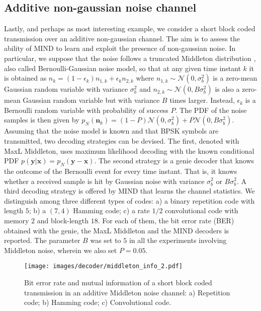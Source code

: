 \subsection{Additive non-gaussian noise channel}
Lastly, and perhaps as most interesting example, we consider a short block coded transmission over an additive non-gaussian channel. The aim is to assess the ability of MIND to learn and exploit the presence of non-gaussian noise. In particular, we suppose that the noise follows a truncated Middleton distribution \cite{Middleton1977}, also called Bernoulli-Gaussian noise model, so that at any given time instant $k$ it is obtained as $n_k = (1-\epsilon_k)n_{1,k}+\epsilon_k n_{2,k}$ where $n_{1,k} \sim \mathcal{N}(0,\sigma_b^2)$ is a zero-mean Gaussian random variable with variance $\sigma_b^2$ and $n_{2,k} \sim \mathcal{N}(0,B\sigma_b^2)$ is also a zero-mean Gaussian random variable but with variance $B$ times larger. Instead, $\epsilon_k$ is a Bernoulli random variable with probability of success $P$. The PDF of the noise samples is then given by
$p_{N}(\mathbf{n}_k) = (1-P)\mathcal{N}(0,\sigma_b^2)+P\mathcal{N}(0,B\sigma_b^2).$
Assuming that the noise model is known and that BPSK symbols are transmitted, two decoding strategies can be devised. The first, denoted with MaxL Middleton, uses maximum likelihood decoding with the known conditional PDF $p(\mathbf{y}|\mathbf{x})=p_{N}(\mathbf{y}-\mathbf{x})$. The second strategy is a genie decoder that knows the outcome of the Bernoulli event for every time instant. That is, it knows whether a received sample is hit by Gaussian noise with variance $\sigma_b^2$ or $B\sigma_b^2$. A third decoding strategy is offered by MIND that learns the channel statistics.
We distinguish among three different types of codes: a) a binary repetition code with length $5$; b) a $(7,4)$ Hamming code; c) a rate $1/2$ convolutional code with memory $2$ and block-length $18$. For each of them, the bit error rate (BER) obtained with the genie, the MaxL Middleton and the MIND decoders is reported. The parameter $B$ was set to $5$ in all the experiments involving Middleton noise, wherein we also set $P=0.05$. 

\begin{figure*}[b]
	\centering
	\texttt{[image: images/decoder/middleton\_info\_2.pdf]}
	\caption{Bit error rate and mutual information of a short block coded transmission in an additive Middleton noise channel: a) Repetition code; b) Hamming code; c) Convolutional code.}
	\label{fig:MIND_middleton}
\end{figure*} 


